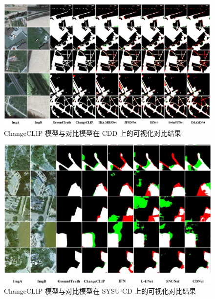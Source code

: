 \begin{figure}[!htbp]
  \centering
  \includegraphics[width=\textwidth]{paper_figures/基于AI基础模型微调的变化检测模型研究/ChangeCLIP/changeclip_cdd.png}
  \caption{ChangeCLIP 模型与对比模型在 CDD 上的可视化对比结果}
  \label{fig:changeclip_cdd}
\end{figure}

\begin{figure}[!htbp]
  \centering
  \includegraphics[width=\textwidth]{paper_figures/基于AI基础模型微调的变化检测模型研究/ChangeCLIP/changeclip_sysu.png}
  \caption{ChangeCLIP 模型与对比模型在 SYSU-CD 上的可视化对比结果}
  \label{fig:changeclip_sysu}
\end{figure}

